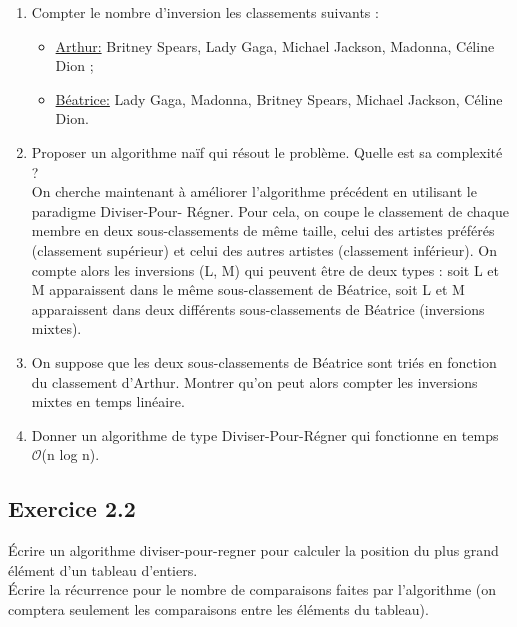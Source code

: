 \documentclass{article}[12pt]
\begin{document}
\begin{enumerate}
    \item Compter le nombre d’inversion les classements suivants :
        \begin{itemize}
            \item[] \underline{Arthur:} Britney Spears, Lady Gaga, Michael Jackson, Madonna, Céline Dion ;
            \item[] \underline{Béatrice:} Lady Gaga, Madonna, Britney Spears, Michael Jackson, Céline Dion.
        \end{itemize}
    \item  Proposer un algorithme naïf qui résout le problème. Quelle est sa complexité ?\\
    
 On cherche maintenant à améliorer l’algorithme précédent en utilisant le paradigme Diviser-Pour-
Régner. Pour cela, on coupe le classement de chaque membre en deux sous-classements de même taille,
celui des artistes préférés (classement supérieur) et celui des autres artistes (classement inférieur). On
compte alors les inversions (L, M) qui peuvent être de deux types : soit L et M apparaissent dans le
même sous-classement de Béatrice, soit L et M apparaissent dans deux différents sous-classements de
Béatrice (inversions mixtes).

    \item On suppose que les deux sous-classements de Béatrice sont triés en fonction du classement d’Arthur. Montrer qu’on peut alors compter les inversions mixtes en temps linéaire.
    
    \item Donner un algorithme de type Diviser-Pour-Régner qui fonctionne en temps $\mathcal{O}$(n log n).
\end{enumerate}




\subsection*{Exercice 2.2}
Écrire un algorithme diviser-pour-regner pour calculer la position du plus grand élément d'un tableau d'entiers.\\ Écrire la récurrence pour le nombre de comparaisons faites par l'algorithme (on comptera seulement les comparaisons entre les éléments du tableau).
\end{document}
